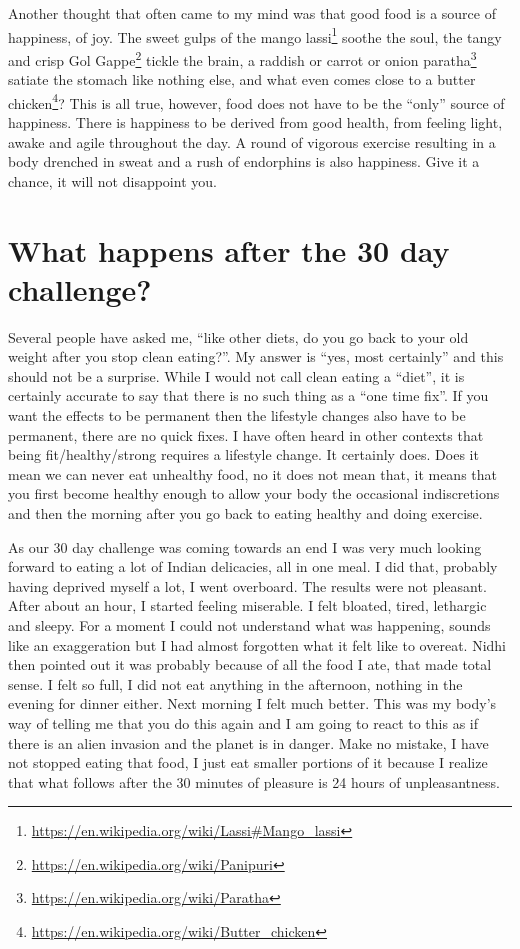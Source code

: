 \documentclass[
  oneside]{book}
\DeclareRobustCommand{\href}[2]{#2\footnote{\url{#1}}}
\begin{document}
Another thought that often came to my mind was that good food is a source of happiness, of joy. The sweet gulps of the \href{https://en.wikipedia.org/wiki/Lassi\#Mango_lassi}{mango lassi} soothe the soul, the tangy and crisp \href{https://en.wikipedia.org/wiki/Panipuri}{Gol Gappe} tickle the brain, a \href{https://en.wikipedia.org/wiki/Paratha}{raddish or carrot or onion paratha} satiate the stomach like nothing else, and what even comes close to a \href{https://en.wikipedia.org/wiki/Butter_chicken}{butter chicken}? This is all true, however, food does not have to be the ``only'' source of happiness. There is happiness to be derived from good health, from feeling light, awake and agile throughout the day. A round of vigorous exercise resulting in a body drenched in sweat and a rush of endorphins is also happiness. Give it a chance, it will not disappoint you.

\hypertarget{what-happens-after-the-30-day-challenge}{%
\section{What happens after the 30 day challenge?}\label{what-happens-after-the-30-day-challenge}}

Several people have asked me, ``like other diets, do you go back to your old weight after you stop clean eating?''. My answer is ``yes, most certainly'' and this should not be a surprise. While I would not call clean eating a ``diet'', it is certainly accurate to say that there is no such thing as a ``one time fix''. If you want the effects to be permanent then the lifestyle changes also have to be permanent, there are no quick fixes. I have often heard in other contexts that being fit/healthy/strong requires a lifestyle change. It certainly does. Does it mean we can never eat unhealthy food, no it does not mean that, it means that you first become healthy enough to allow your body the occasional indiscretions and then the morning after you go back to eating healthy and doing exercise.

As our 30 day challenge was coming towards an end I was very much looking forward to eating a lot of Indian delicacies, all in one meal. I did that, probably having deprived myself a lot, I went overboard. The results were not pleasant. After about an hour, I started feeling miserable. I felt bloated, tired, lethargic and sleepy. For a moment I could not understand what was happening, sounds like an exaggeration but I had almost forgotten what it felt like to overeat. Nidhi then pointed out it was probably because of all the food I ate, that made total sense. I felt so full, I did not eat anything in the afternoon, nothing in the evening for dinner either. Next morning I felt much better. This was my body's way of telling me that you do this again and I am going to react to this as if there is an alien invasion and the planet is in danger. Make no mistake, I have not stopped eating that food, I just eat smaller portions of it because I realize that what follows after the 30 minutes of pleasure is 24 hours of unpleasantness.
\end{document}

